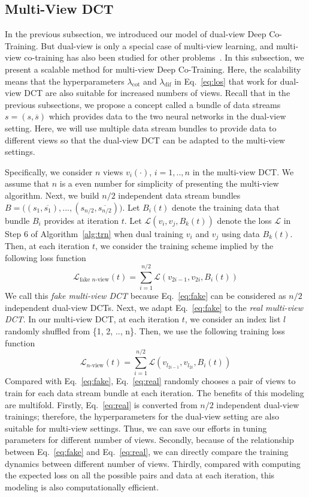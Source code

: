 \documentclass[runningheads]{llncs}
\begin{document}
\subsection{Multi-View DCT}
In the previous subsection, we introduced our model of dual-view Deep Co-Training.
But dual-view is only a special case of multi-view learning, and multi-view co-training has also been studied for other problems~\cite{tritrain,multiview}.
In this subsection, we present a scalable method for multi-view Deep Co-Training.
Here, the scalability means that the hyperparameters $\lambda_{\text{cot}}$ and $\lambda_{\text{dif}}$ in Eq.~\ref{eq:los} that work for dual-view DCT are also suitable for increased numbers of views.
Recall that in the previous subsections, we propose a concept called a bundle of data streams $s=(s, \overline{s})$ which provides data to the two neural networks in the dual-view setting.
Here, we will use multiple data stream bundles to provide data to different views so that the dual-view DCT can be adapted to the multi-view settings.

Specifically, we consider $n$ views $v_i(\cdot)$, $i=1,..,n$ in the multi-view DCT.
We assume that $n$ is a even number for simplicity of presenting the multi-view algorithm.
Next, we build $n/2$ independent data stream bundles $B=\big( (s_1, \overline{s_1}), ..., (s_{n/2}, \overline{s_{n/2}})  \big)$.
Let $B_i(t)$ denote the training data that bundle $B_i$ provides at iteration $t$.
Let $\mathcal{L}(v_i, v_j, B_k(t))$ denote the loss $\mathcal{L}$ in Step $6$ of Algorithm~\ref{alg:trn} when dual training $v_i$ and $v_j$ using data $B_k(t)$.
Then, at each iteration $t$, we consider the training scheme implied by the following loss function
\begin{equation}\label{eq:fake}
  \mathcal{L}_{\text{fake $n$-view}}(t) = \sum_{i=1}^{n/2}\mathcal{L}(v_{2i - 1}, v_{2i}, B_i(t))
\end{equation}
We call this \emph{fake multi-view DCT} because Eq.~\ref{eq:fake} can be considered as $n/2$ independent dual-view DCTs.
Next, we adapt Eq.~\ref{eq:fake} to the \emph{real multi-view DCT}.
In our multi-view DCT, at each iteration $t$, we consider an index list $l$ randomly shuffled  from \{1, 2, .., n\}.
Then, we use the following training loss function
\begin{equation}\label{eq:real}
    \mathcal{L}_{\text{$n$-view}}(t) = \sum_{i=1}^{n/2}\mathcal{L}(v_{l_{2i - 1}}, v_{l_{2i}}, B_i(t))
\end{equation}
Compared with Eq.~\ref{eq:fake}, Eq.~\ref{eq:real} randomly chooses a pair of views to train for each data stream bundle at each iteration.
The benefits of this modeling are multifold.
Firstly, Eq.~\ref{eq:real} is converted from $n/2$ independent dual-view trainings; therefore, the hyperparameters for the dual-view setting are also suitable for multi-view settings.
Thus, we can save our efforts in tuning parameters for different number of views.
Secondly, because of the relationship between Eq.~\ref{eq:fake} and Eq.~\ref{eq:real}, we can directly compare the training dynamics between different number of views.
Thirdly, compared with computing the expected loss on all the possible pairs and data at each iteration, this modeling is also computationally efficient.
\end{document}
